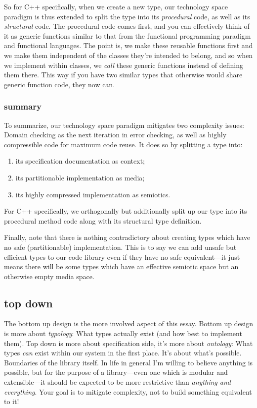 \documentclass[twoside]{article}
\begin{document}
So for C++ specifically, when we create a new type, our technology space paradigm is thus extended to split the type into
its \emph{procedural} code, as well as its \emph{structural} code. The procedural code comes first, and you can effectively
think of it as generic functions similar to that from the functional programming paradigm and functional languages.
The point is, we make these reusable functions first and we make them independent of the classes they're intended to belong,
and so when we implement within classes, we \emph{call} these generic functions instead of defining them there.
This way if you have two similar types that otherwise would share generic function code, they now can.

\subsubsection*{summary}

To summarize, our technology space paradigm mitigates two complexity issues: Domain checking as the next iteration in error
checking, as well as highly compressible code for maximum code reuse. It does so by splitting a type into:
\begin{enumerate}
\item its specification documentation as context;
\item its partitionable implementation as media;
\item its highly compressed implementation as semiotics.
\end{enumerate}

For C++ specifically, we orthogonally but additionally split up our type
into its procedural method code along with its structural type definition.

Finally, note that there is nothing contradictory about creating types which have no safe (partitionable) implementation.
This is to say we can add unsafe but efficient types to our code library even if they have no safe equivalent---it just
means there will be some types which have an effective semiotic space but an otherwise empty media space.

\subsection*{top down}

The bottom up design is the more involved aspect of this essay. Bottom up design is more about \emph{typology}: What types
actually exist (and how best to implement them). Top down is more about specification side, it's more about \emph{ontology}:
What types \emph{can} exist within our system in the first place. It's about what's possible. Boundaries of the library
itself. In life in general I'm willing to believe anything is possible, but for the purpose of a library---even one which
is modular and extensible---it should be expected to be more restrictive than \emph{anything and everything}.
Your goal is to mitigate complexity, not to build something equivalent to it!
\end{document}
